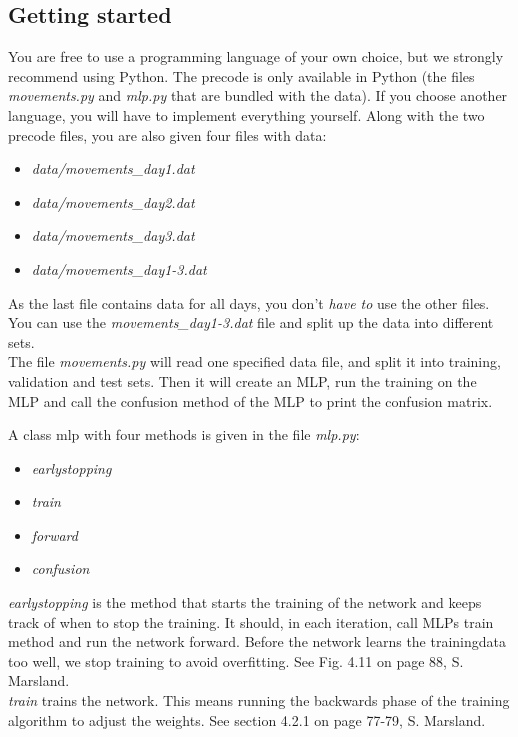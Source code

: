 \documentclass{article}           %
\begin{document}
\subsection*{Getting started}

You are free to use a programming language of your own choice, but we strongly recommend using Python.
The precode is only available in Python (the files \emph{movements.py} and \emph{mlp.py} that are bundled with the data).
If you choose another language, you will have to implement everything yourself.
Along with the two precode files, you are also given four files with data:
\begin{itemize}
\item \emph{data/movements\_day1.dat}
\item \emph{data/movements\_day2.dat}
\item \emph{data/movements\_day3.dat}
\item \emph{data/movements\_day1-3.dat}
\end{itemize}
As the last file contains data for all days, you don't \emph{have to} use the other files.
You can use the \emph{movements\_day1-3.dat} file and split up the data into different sets.\\


The file \emph{movements.py} will read one specified data file, and split it into training, validation and test sets. Then it will create an MLP, run the training on the MLP and call the confusion method of the MLP to print the confusion matrix.

\noindent A class mlp with four methods is given in the file \emph{mlp.py}:

\begin{itemize}
\item \emph{earlystopping}
\item \emph{train}
\item \emph{forward}
\item \emph{confusion}
\end{itemize}

\noindent \emph{earlystopping} is the method that starts the training of the network and keeps track of when to stop the training. It should, in each iteration, call MLPs train method and run the network forward. Before the network learns the trainingdata too well, we stop training to avoid overfitting. See Fig. 4.11 on page 88, S. Marsland.\\

\noindent \emph{train} trains the network. This means running the backwards phase of the training algorithm to adjust the weights. See section 4.2.1 on page 77-79, S. Marsland.\\
\end{document}
